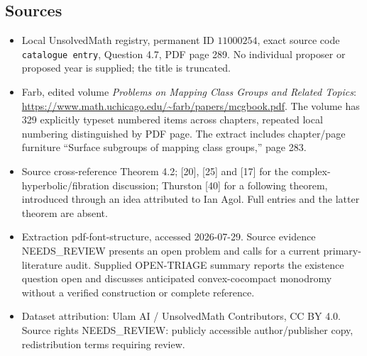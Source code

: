 \documentclass[11pt]{article}
\begin{document}
\subsection{Sources}
\begin{itemize}
\item Local UnsolvedMath registry, permanent ID \(11000254\), exact source code \texttt{catalogue entry}, Question 4.7, PDF page 289. No individual proposer or proposed year is supplied; the title is truncated.
\item Farb, edited volume \emph{Problems on Mapping Class Groups and Related Topics}: \url{https://www.math.uchicago.edu/~farb/papers/mcgbook.pdf}. The volume has 329 explicitly typeset numbered items across chapters, repeated local numbering distinguished by PDF page. The extract includes chapter/page furniture ``Surface subgroups of mapping class groups,'' page 283.
\item Source cross-reference Theorem 4.2; [20], [25] and [17] for the complex-hyperbolic/fibration discussion; Thurston [40] for a following theorem, introduced through an idea attributed to Ian Agol. Full entries and the latter theorem are absent.
\item Extraction pdf-font-structure, accessed 2026-07-29. Source evidence NEEDS\_REVIEW presents an open problem and calls for a current primary-literature audit. Supplied OPEN-TRIAGE summary reports the existence question open and discusses anticipated convex-cocompact monodromy without a verified construction or complete reference.
\item Dataset attribution: Ulam AI / UnsolvedMath Contributors, CC BY 4.0. Source rights NEEDS\_REVIEW: publicly accessible author/publisher copy, redistribution terms requiring review.
\end{itemize}
\end{document}
